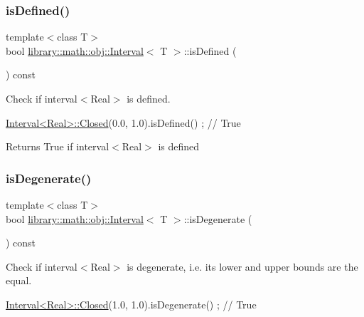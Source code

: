\subsubsection{\texorpdfstring{is\+Defined()}{isDefined()}}
{\footnotesize\ttfamily template$<$class T$>$ \\
bool \hyperlink{classlibrary_1_1math_1_1obj_1_1_interval}{library\+::math\+::obj\+::\+Interval}$<$ T $>$\+::is\+Defined (\begin{DoxyParamCaption}{ }\end{DoxyParamCaption}) const}



Check if interval$<$\+Real$>$ is defined. 


\begin{DoxyCode}
\hyperlink{classlibrary_1_1math_1_1obj_1_1_interval_aae8bb2b89af450729338d48563def4d7}{Interval<Real>::Closed}(0.0, 1.0).isDefined() ; \textcolor{comment}{// True}
\end{DoxyCode}


\begin{DoxyReturn}{Returns}
True if interval$<$\+Real$>$ is defined 
\end{DoxyReturn}
\mbox{\label{classlibrary_1_1math_1_1obj_1_1_interval_a0e9997639f0c415f4f7fe8dcb58e13a8}} 
\subsubsection{\texorpdfstring{is\+Degenerate()}{isDegenerate()}}
{\footnotesize\ttfamily template$<$class T$>$ \\
bool \hyperlink{classlibrary_1_1math_1_1obj_1_1_interval}{library\+::math\+::obj\+::\+Interval}$<$ T $>$\+::is\+Degenerate (\begin{DoxyParamCaption}{ }\end{DoxyParamCaption}) const}



Check if interval$<$\+Real$>$ is degenerate, i.\+e. its lower and upper bounds are the equal. 


\begin{DoxyCode}
\hyperlink{classlibrary_1_1math_1_1obj_1_1_interval_aae8bb2b89af450729338d48563def4d7}{Interval<Real>::Closed}(1.0, 1.0).isDegenerate() ; \textcolor{comment}{// True}
\end{DoxyCode}


